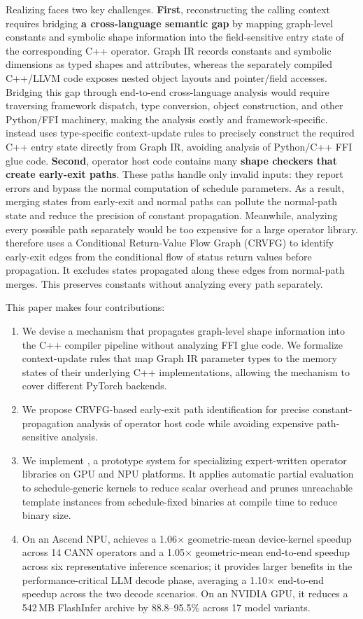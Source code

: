 Realizing \mysys faces two key challenges.
\textbf{First}, reconstructing the calling context requires bridging \textbf{a cross-language semantic gap} by mapping graph-level constants and symbolic shape information into the field-sensitive entry state of the corresponding C++ operator.
Graph IR records constants and symbolic dimensions as typed shapes and attributes, whereas the separately compiled C++/LLVM code exposes nested object layouts and pointer/field accesses. 
Bridging this gap through end-to-end cross-language analysis would require traversing framework dispatch, type conversion, object construction, and other Python/FFI machinery, making the analysis costly and framework-specific. 
\mysys instead uses type-specific context-update rules to precisely construct the required C++ entry state directly from Graph IR, avoiding analysis of Python/C++ FFI glue code.
\textbf{Second}, operator host code contains many \textbf{shape checkers that create early-exit paths}.
These paths handle only invalid inputs: they report errors and bypass the normal computation of schedule parameters.
As a result, merging states from early-exit and normal paths can pollute the normal-path state and reduce the precision of constant propagation.
Meanwhile, analyzing every possible path separately would be too expensive for a large operator library.
\mysys therefore uses a Conditional Return-Value Flow Graph (CRVFG) to identify early-exit edges from the conditional flow of status return values before propagation.
It excludes states propagated along these edges from normal-path merges.
This preserves constants without analyzing every path separately.

This paper makes four contributions:
\begin{enumerate}
    \item We devise a mechanism that propagates graph-level shape information into the C++ compiler pipeline without analyzing FFI glue code. We formalize context-update rules that map Graph IR parameter types to the memory states of their underlying C++ implementations, allowing the mechanism to cover different PyTorch backends.
    \item We propose CRVFG-based early-exit path identification for precise constant-propagation analysis of operator host code while avoiding expensive path-sensitive analysis.
    \item We implement \mysys, a prototype system for specializing expert-written operator libraries on GPU and NPU platforms. It applies automatic partial evaluation to schedule-generic kernels to reduce scalar overhead and prunes unreachable template instances from schedule-fixed binaries at compile time to reduce binary size.
    \item On an Ascend NPU, \mysys achieves a 1.06$\times$ geometric-mean device-kernel speedup across 14 CANN operators and a 1.05$\times$ geometric-mean end-to-end speedup across six representative inference scenarios; it provides larger benefits in the performance-critical LLM decode phase, averaging a 1.10$\times$ end-to-end speedup across the two decode scenarios. On an NVIDIA GPU, it reduces a 542\,MB FlashInfer archive by 88.8--95.5\% across 17 model variants.
\end{enumerate}
